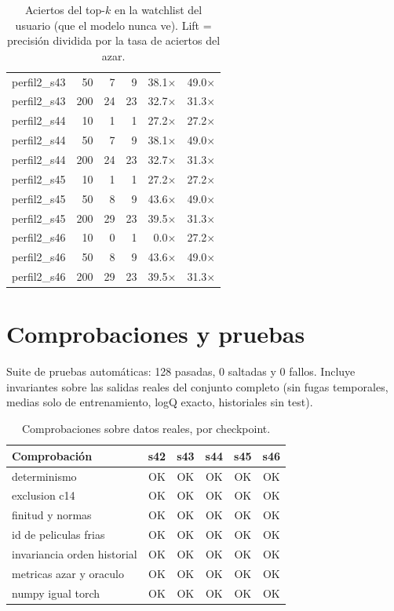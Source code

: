 \begin{table}[H]
\begin{tabular}{lrrrrr}
perfil2\_s43 & 50 & 7 & 9 & 38.1$\times$ & 49.0$\times$ \\
perfil2\_s43 & 200 & 24 & 23 & 32.7$\times$ & 31.3$\times$ \\
perfil2\_s44 & 10 & 1 & 1 & 27.2$\times$ & 27.2$\times$ \\
perfil2\_s44 & 50 & 7 & 9 & 38.1$\times$ & 49.0$\times$ \\
perfil2\_s44 & 200 & 24 & 23 & 32.7$\times$ & 31.3$\times$ \\
perfil2\_s45 & 10 & 1 & 1 & 27.2$\times$ & 27.2$\times$ \\
perfil2\_s45 & 50 & 8 & 9 & 43.6$\times$ & 49.0$\times$ \\
perfil2\_s45 & 200 & 29 & 23 & 39.5$\times$ & 31.3$\times$ \\
perfil2\_s46 & 10 & 0 & 1 & 0.0$\times$ & 27.2$\times$ \\
perfil2\_s46 & 50 & 8 & 9 & 43.6$\times$ & 49.0$\times$ \\
perfil2\_s46 & 200 & 29 & 23 & 39.5$\times$ & 31.3$\times$ \\
\bottomrule\end{tabular}
\caption{Aciertos del top-$k$ en la watchlist del usuario (que el modelo nunca ve). Lift = precisión dividida por la tasa de aciertos del azar.}\end{table}

\section{Comprobaciones y pruebas}

Suite de pruebas automáticas: 128 pasadas, 0 saltadas y 0 fallos. Incluye invariantes sobre las salidas reales del conjunto completo (sin fugas temporales, medias solo de entrenamiento, logQ exacto, historiales sin test).

\begin{table}[H]\centering\small
\begin{tabular}{lccccc}\toprule
Comprobación & s42 & s43 & s44 & s45 & s46 \\\midrule
determinismo & OK & OK & OK & OK & OK \\
exclusion c14 & OK & OK & OK & OK & OK \\
finitud y normas & OK & OK & OK & OK & OK \\
id de peliculas frias & OK & OK & OK & OK & OK \\
invariancia orden historial & OK & OK & OK & OK & OK \\
metricas azar y oraculo & OK & OK & OK & OK & OK \\
numpy igual torch & OK & OK & OK & OK & OK \\
\bottomrule\end{tabular}
\caption{Comprobaciones sobre datos reales, por checkpoint.}\end{table}

